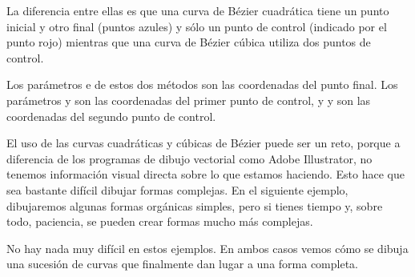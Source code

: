 La diferencia entre ellas es que una curva de Bézier cuadrática tiene un punto inicial y otro final (puntos azules) y sólo un punto de control (indicado por el punto rojo) mientras que una curva de Bézier cúbica utiliza dos puntos de control.

\vspace{5mm} %
\begin{center}
\end{center}
\vspace{5mm} %

Los parámetros  e  de estos dos métodos son las coordenadas del punto final. Los parámetros  y  son las coordenadas del primer punto de control, y  y  son las coordenadas del segundo punto de control.

El uso de las curvas cuadráticas y cúbicas de Bézier puede ser un reto, porque a diferencia de los programas de dibujo vectorial como Adobe Illustrator, no tenemos información visual directa sobre lo que estamos haciendo. Esto hace que sea bastante difícil dibujar formas complejas. En el siguiente ejemplo, dibujaremos algunas formas orgánicas simples, pero si tienes tiempo y, sobre todo, paciencia, se pueden crear formas mucho más complejas.

No hay nada muy difícil en estos ejemplos. En ambos casos vemos cómo se dibuja una sucesión de curvas que finalmente dan lugar a una forma completa.

